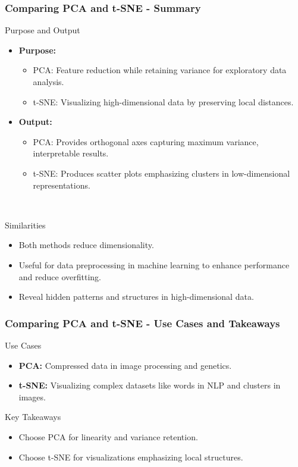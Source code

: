 \documentclass[aspectratio=169]{beamer}
\begin{document}
\begin{frame}[fragile]
    \frametitle{Comparing PCA and t-SNE - Summary}
    \begin{block}{Purpose and Output}
        \begin{itemize}
            \item \textbf{Purpose:}
            \begin{itemize}
                \item PCA: Feature reduction while retaining variance for exploratory data analysis.
                \item t-SNE: Visualizing high-dimensional data by preserving local distances.
            \end{itemize}
            \item \textbf{Output:}
            \begin{itemize}
                \item PCA: Provides orthogonal axes capturing maximum variance, interpretable results.
                \item t-SNE: Produces scatter plots emphasizing clusters in low-dimensional representations.
            \end{itemize}
        \end{itemize}
    \end{block}
\    \begin{block}{Similarities}
        \begin{itemize}
            \item Both methods reduce dimensionality.
            \item Useful for data preprocessing in machine learning to enhance performance and reduce overfitting.
            \item Reveal hidden patterns and structures in high-dimensional data.
        \end{itemize}
    \end{block}
\end{frame}

\begin{frame}[fragile]
    \frametitle{Comparing PCA and t-SNE - Use Cases and Takeaways}
    \begin{block}{Use Cases}
        \begin{itemize}
            \item \textbf{PCA:} Compressed data in image processing and genetics.
            \item \textbf{t-SNE:} Visualizing complex datasets like words in NLP and clusters in images.
        \end{itemize}
    \end{block}
    \begin{block}{Key Takeaways}
        \begin{itemize}
            \item Choose PCA for linearity and variance retention.
            \item Choose t-SNE for visualizations emphasizing local structures.
        \end{itemize}
    \end{block}
\end{frame}
\end{document}
